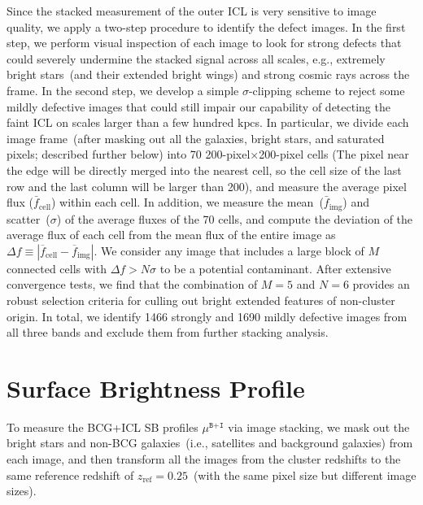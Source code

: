 \documentclass[fleqn,usenatbib]{mnras}
\newcommand{\mubi}{\mu^{\texttt{B+I}}}
\newcommand{\kpc}{\mathrm{kpc}}
\newcommand\xkchen[1]{{\color{cyan} {#1}}}
\begin{document}
Since the stacked measurement of the outer ICL is very sensitive to image
quality, we apply a two-step procedure to identify the defect images.  In
the first step, we perform visual inspection of each image to look for
strong defects that could severely undermine the stacked signal across all
scales, e.g., extremely bright stars~(and their extended bright wings) and
strong cosmic rays across the frame. In the second step, we develop a
simple $\sigma$-clipping scheme to reject some mildly defective images that
could still impair our capability of detecting the faint ICL on scales
larger than a few hundred $\kpc$s. In particular, we divide each image
frame~(after masking out all the galaxies, bright stars, and saturated
pixels; described further below) into \xkchen{70} 200-pixel${\times}$200-pixel
cells \xkchen{(The pixel near the edge will be directly merged into the nearest cell, so the cell size of the last row and the last column will be larger than 200)}, and measure the average pixel flux ($\bar{f}_{\mathrm{cell}}$)
within each cell. In addition, we measure the
mean~($\bar{f}_{\mathrm{img}}$) and scatter~($\sigma$) of the average
fluxes of the \xkchen{70} cells, and compute the deviation of the average flux of
each cell from the mean flux of the entire image as $\Delta
f{\equiv}|\overline{f}_{\mathrm{cell}}{-}\overline{f}_{\mathrm{img}}|$. We
consider any image that includes a large block of $M$ connected cells with
$\Delta f{>}N \sigma$ to be a potential contaminant. After extensive
convergence tests, we find that the combination of \xkchen{$M{=}5$} and
\xkchen{$N{=}6$} provides an robust selection criteria for culling out bright
extended features of non-cluster origin.  In total, we identify \xkchen{1466}
strongly and \xkchen{1690} mildly defective images from all three bands and exclude
them from further stacking analysis.


\section{Surface Brightness Profile}
\label{sec:sb}


To measure the BCG+ICL SB profiles $\mubi$ via image stacking, we mask out
the bright stars and non-BCG galaxies~(i.e., satellites and background
galaxies) from each image, and then transform all the images from the
cluster redshifts to the same reference redshift of
$z_{\mathrm{ref}}{=}0.25$~(with the same pixel size but different image
sizes).
\end{document}
